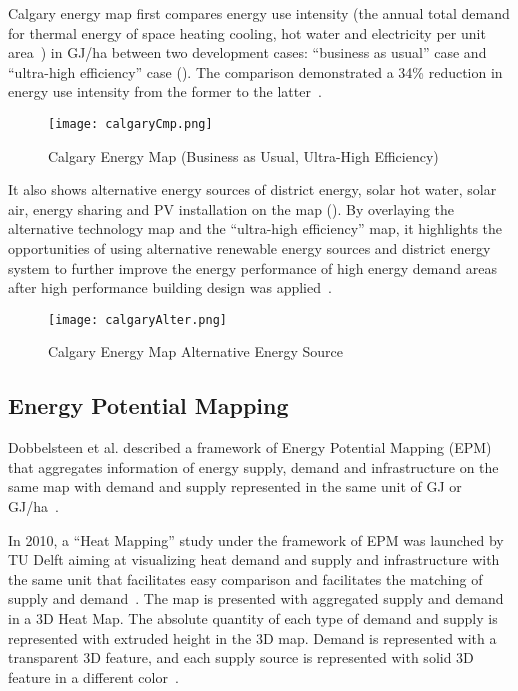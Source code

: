 Calgary energy map first compares energy use intensity (the annual
total demand for thermal energy of space heating cooling, hot water
and electricity per unit area~\cite{aacip2009}) in GJ/ha between two
development cases: ``business as usual'' case and ``ultra-high
efficiency'' case (). The comparison demonstrated
a 34\% reduction in energy use intensity from the former to the
latter~\cite{aacip2009}.

\begin{figure}[h!]
  \centering
  \texttt{[image: calgaryCmp.png]}
  \caption[Calgary Energy Demand Map]{Calgary Energy Map (Business as Usual, Ultra-High
    Efficiency)~\cite{aacip2009}}
  \label{fig:calgaryCmp}
\end{figure}

It also shows alternative energy sources of district energy, solar hot
water, solar air, energy sharing and PV installation on the map
(). By overlaying the alternative technology
map and the ``ultra-high efficiency'' map, it highlights the
opportunities of using alternative renewable energy sources and
district energy system to further improve the energy performance of
high energy demand areas after high performance building design was
applied~\cite{aacip2009}.

\begin{figure}[h!]
  \centering
  \texttt{[image: calgaryAlter.png]}
  \caption{Calgary Energy Map Alternative Energy Source~\cite{aacip2009}}
  \label{fig:calgaryAlter}
\end{figure}

\subsection{Energy Potential Mapping}
Dobbelsteen et al. described a framework of Energy Potential Mapping
(EPM) that aggregates information of energy supply, demand and
infrastructure on the same map with demand and supply represented in
the same unit of GJ or GJ/ha~\cite{Dobbelsteen2013}.

In 2010, a ``Heat Mapping'' study under the framework of EPM was
launched by TU Delft aiming at visualizing heat demand and supply and
infrastructure with the same unit that facilitates easy comparison and
facilitates the matching of supply and
demand~\cite{Dobbelsteen2013}. The map is presented with aggregated
supply and demand in a 3D Heat Map. The absolute quantity of each type
of demand and supply is represented with extruded height in the 3D
map. Demand is represented with a transparent 3D feature, and each
supply source is represented with solid 3D feature in a different
color~\cite{Dobbelsteen2013}.

